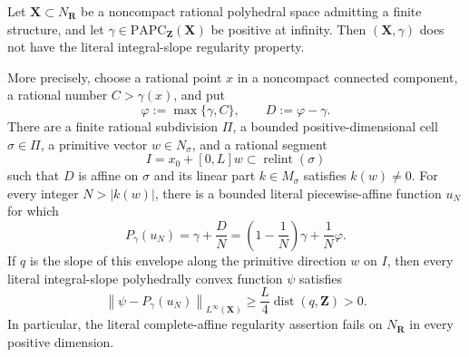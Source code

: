 
\begin{theorem}
\label{thm:frontier-polyhedral-noncompact-literal-nonregularity}
Let $\mathbf X\subset N_{\mathbf R}$ be a noncompact rational polyhedral
space admitting a finite structure, and let
$\gamma\in\mathrm{PAPC}_{\mathbf Z}(\mathbf X)$ be positive at infinity.
Then $(\mathbf X,\gamma)$ does not have the literal integral-slope
regularity property.

More precisely, choose a rational point $x$ in a noncompact connected
component, a rational number $C>\gamma(x)$, and put
\[
                 \varphi:=\max\{\gamma,C\},
                 \qquad D:=\varphi-\gamma.
\]
There are a finite rational subdivision $\Pi$, a bounded positive-dimensional
cell $\sigma\in\Pi$, a primitive vector $w\in N_\sigma$, and a rational
segment
\[
             I=x_0+[0,L]w\subset\operatorname{relint}(\sigma)
\]
such that $D$ is affine on $\sigma$ and its linear part $k\in M_\sigma$
satisfies $k(w)\neq0$.  For every integer $N>|k(w)|$, there is a bounded
literal piecewise-affine function $u_N$ for which
\begin{equation}
 P_\gamma(u_N)
 =\gamma+\frac{D}{N}
 =\left(1-\frac1N\right)\gamma+\frac1N\varphi.
 \label{eq:frontier-polyhedral-noncompact-literal-envelope}
\end{equation}
If $q$ is the slope of this envelope along the primitive direction $w$ on
$I$, then every literal integral-slope polyhedrally convex function $\psi$
satisfies
\begin{equation}
 \left\lVert\psi-P_\gamma(u_N)\right\rVert_{L^\infty(\mathbf X)}
 \geq \frac{L}{4}\operatorname{dist}(q,\mathbf Z)>0.
 \label{eq:frontier-polyhedral-noncompact-literal-separation}
\end{equation}
In particular, the literal complete-affine regularity assertion fails on
$N_{\mathbf R}$ in every positive dimension.
\end{theorem}
